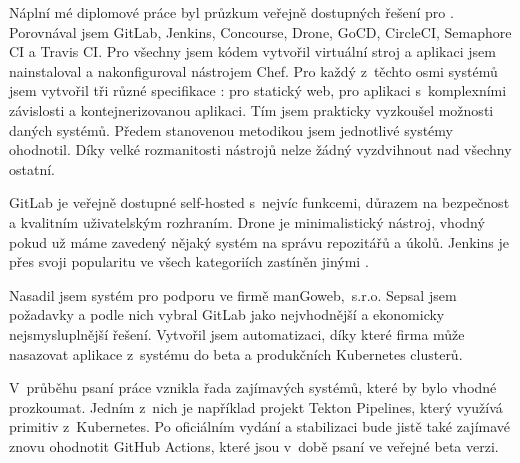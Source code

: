 \label{Závěr}
    Náplní mé diplomové práce byl průzkum veřejně dostupných řešení pro \CICD. Porovnával jsem GitLab, Jenkins, Concourse, Drone, GoCD, CircleCI, Semaphore CI a Travis CI. Pro všechny jsem kódem vytvořil virtuální stroj a aplikaci jsem nainstaloval a nakonfiguroval nástrojem Chef. Pro každý z~těchto osmi systémů jsem vytvořil tři různé specifikace \CI: pro statický web, pro aplikaci s~komplexními závislosti a kontejnerizovanou aplikaci. Tím jsem prakticky vyzkoušel možnosti daných systémů. Předem stanovenou metodikou jsem jednotlivé systémy ohodnotil. Díky velké rozmanitosti nástrojů nelze žádný vyzdvihnout nad všechny ostatní.

    GitLab je veřejně dostupné self-hosted \CI s~nejvíc funkcemi, důrazem na bezpečnost a kvalitním uživatelským rozhraním. Drone je minimalistický nástroj, vhodný pokud už máme zavedený nějaký systém na správu repozitářů a úkolů. Jenkins je přes svoji popularitu ve všech kategoriích zastíněn jinými \CICD.

    Nasadil jsem systém pro podporu \CICD ve firmě manGoweb,~s.r.o. Sepsal jsem požadavky a podle nich vybral GitLab jako nejvhodnější a ekonomicky nejsmysluplnější řešení. Vytvořil jsem automatizaci, díky které firma může nasazovat aplikace z~\CI systému do beta a produkčních Kubernetes clusterů.

    V~průběhu psaní práce vznikla řada zajímavých \CICD systémů, které by bylo vhodné prozkoumat. Jedním z~nich je například projekt Tekton Pipelines, který využívá primitiv z~Kubernetes. Po oficiálním vydání a stabilizaci bude jistě také zajímavé znovu ohodnotit GitHub Actions, které jsou v~době psaní ve veřejné beta verzi.
